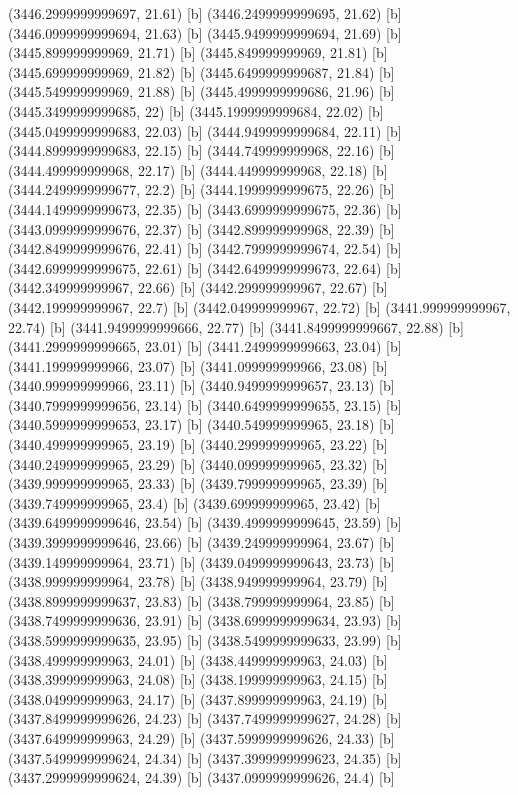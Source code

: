 {{{(3446.2999999999697, 21.61) [b] 
(3446.2499999999695, 21.62) [b] 
(3446.0999999999694, 21.63) [b] 
(3445.9499999999694, 21.69) [b] 
(3445.899999999969, 21.71) [b] 
(3445.849999999969, 21.81) [b] 
(3445.699999999969, 21.82) [b] 
(3445.6499999999687, 21.84) [b] 
(3445.549999999969, 21.88) [b] 
(3445.4999999999686, 21.96) [b] 
(3445.3499999999685, 22) [b] 
(3445.1999999999684, 22.02) [b] 
(3445.0499999999683, 22.03) [b] 
(3444.9499999999684, 22.11) [b] 
(3444.8999999999683, 22.15) [b] 
(3444.749999999968, 22.16) [b] 
(3444.499999999968, 22.17) [b] 
(3444.449999999968, 22.18) [b] 
(3444.2499999999677, 22.2) [b] 
(3444.1999999999675, 22.26) [b] 
(3444.1499999999673, 22.35) [b] 
(3443.6999999999675, 22.36) [b] 
(3443.0999999999676, 22.37) [b] 
(3442.899999999968, 22.39) [b] 
(3442.8499999999676, 22.41) [b] 
(3442.7999999999674, 22.54) [b] 
(3442.6999999999675, 22.61) [b] 
(3442.6499999999673, 22.64) [b] 
(3442.349999999967, 22.66) [b] 
(3442.299999999967, 22.67) [b] 
(3442.199999999967, 22.7) [b] 
(3442.049999999967, 22.72) [b] 
(3441.999999999967, 22.74) [b] 
(3441.9499999999666, 22.77) [b] 
(3441.8499999999667, 22.88) [b] 
(3441.2999999999665, 23.01) [b] 
(3441.2499999999663, 23.04) [b] 
(3441.199999999966, 23.07) [b] 
(3441.099999999966, 23.08) [b] 
(3440.999999999966, 23.11) [b] 
(3440.9499999999657, 23.13) [b] 
(3440.7999999999656, 23.14) [b] 
(3440.6499999999655, 23.15) [b] 
(3440.5999999999653, 23.17) [b] 
(3440.549999999965, 23.18) [b] 
(3440.499999999965, 23.19) [b] 
(3440.299999999965, 23.22) [b] 
(3440.249999999965, 23.29) [b] 
(3440.099999999965, 23.32) [b] 
(3439.999999999965, 23.33) [b] 
(3439.799999999965, 23.39) [b] 
(3439.749999999965, 23.4) [b] 
(3439.699999999965, 23.42) [b] 
(3439.6499999999646, 23.54) [b] 
(3439.4999999999645, 23.59) [b] 
(3439.3999999999646, 23.66) [b] 
(3439.249999999964, 23.67) [b] 
(3439.149999999964, 23.71) [b] 
(3439.0499999999643, 23.73) [b] 
(3438.999999999964, 23.78) [b] 
(3438.949999999964, 23.79) [b] 
(3438.8999999999637, 23.83) [b] 
(3438.799999999964, 23.85) [b] 
(3438.7499999999636, 23.91) [b] 
(3438.6999999999634, 23.93) [b] 
(3438.5999999999635, 23.95) [b] 
(3438.5499999999633, 23.99) [b] 
(3438.499999999963, 24.01) [b] 
(3438.449999999963, 24.03) [b] 
(3438.399999999963, 24.08) [b] 
(3438.199999999963, 24.15) [b] 
(3438.049999999963, 24.17) [b] 
(3437.899999999963, 24.19) [b] 
(3437.8499999999626, 24.23) [b] 
(3437.7499999999627, 24.28) [b] 
(3437.649999999963, 24.29) [b] 
(3437.5999999999626, 24.33) [b] 
(3437.5499999999624, 24.34) [b] 
(3437.3999999999623, 24.35) [b] 
(3437.2999999999624, 24.39) [b] 
(3437.0999999999626, 24.4) [b] 
}}}
